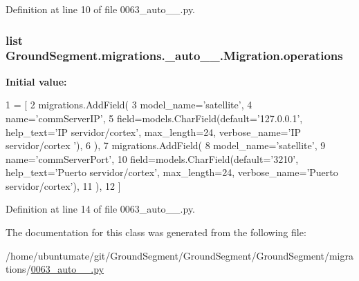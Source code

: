 Definition at line 10 of file 0063\+\_\+auto\+\_\+\_.\+py.

\hypertarget{class_ground_segment_1_1migrations_1_10063__auto__20170601__1929_1_1_migration_abe719102f2ab1088ea7139734deb99c9}{}
\subsubsection[{operations}]{\setlength{\rightskip}{0pt plus 5cm}list Ground\+Segment.\+migrations.\+\_\+auto\+\_\+\_.\+Migration.\+operations\hspace{0.3cm}{\ttfamily [static]}}\label{class_ground_segment_1_1migrations_1_10063__auto__20170601__1929_1_1_migration_abe719102f2ab1088ea7139734deb99c9}
{\bfseries Initial value\+:}
\begin{DoxyCode}
1 = [
2         migrations.AddField(
3             model\_name=\textcolor{stringliteral}{'satellite'},
4             name=\textcolor{stringliteral}{'commServerIP'},
5             field=models.CharField(default=\textcolor{stringliteral}{'127.0.0.1'}, help\_text=\textcolor{stringliteral}{'IP servidor/cortex'}, max\_length=24, 
      verbose\_name=\textcolor{stringliteral}{'IP servidor/cortex '}),
6         ),
7         migrations.AddField(
8             model\_name=\textcolor{stringliteral}{'satellite'},
9             name=\textcolor{stringliteral}{'commServerPort'},
10             field=models.CharField(default=\textcolor{stringliteral}{'3210'}, help\_text=\textcolor{stringliteral}{'Puerto servidor/cortex'}, max\_length=24, 
      verbose\_name=\textcolor{stringliteral}{'Puerto servidor/cortex'}),
11         ),
12     ]
\end{DoxyCode}


Definition at line 14 of file 0063\+\_\+auto\+\_\+\_.\+py.



The documentation for this class was generated from the following file\+:\begin{DoxyCompactItemize}
\item 
/home/ubuntumate/git/\+Ground\+Segment/\+Ground\+Segment/\+Ground\+Segment/migrations/\hyperlink{0063__auto__20170601__1929_8py}{0063\+\_\+auto\+\_\+\_.\+py}\end{DoxyCompactItemize}
